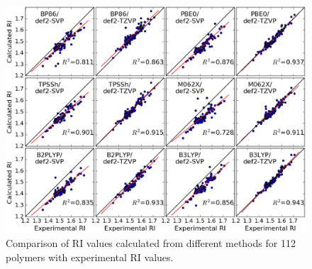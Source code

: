 \begin{figure}[htbp] 
	\centering
	\includegraphics[width=1.00\textwidth]{Chapter-3/Figures/RI_all_methods.eps}
	\caption{Comparison of RI values calculated from different methods for 112 polymers with experimental RI values.} 
	\label{fig:RI_all_methods} 
\end{figure}  




